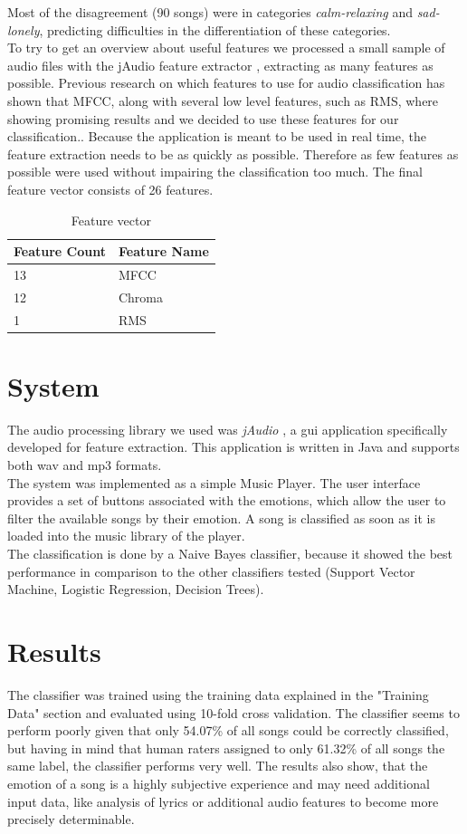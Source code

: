 \documentclass{sigchi-ext}
\begin{document}
Most of the disagreement (90 songs) were in categories \textit{calm-relaxing} and \textit{sad-lonely}, predicting difficulties in the differentiation of these categories.\\

To try to get an overview about useful features we processed a small sample of audio files with the jAudio feature extractor \cite{McEnnis2005}, extracting as many features as possible.
Previous research on which features to use for audio classification has shown that MFCC, along with several low level features, such as RMS, where showing promising results and we decided to use these features for our classification.\cite{Mckinney2003, Mandel2005, Tzanetakis2001}.  Because the application is meant to be used in real time, the feature extraction needs to be as quickly as possible. Therefore as few features as possible were used without impairing the classification too much. The final feature vector consists of 26 features.

\begin{table}
  \centering
  \begin{tabular}{@{}ll@{}}
    Feature Count & Feature Name \\ \midrule
    13 & MFCC \\
    12 & Chroma \\
    1  & RMS
  \end{tabular}
  \caption{Feature vector}
  \label{feature-vector}
\end{table}

\section{System}
The audio processing library we used was \textit{jAudio} \cite{McEnnis2005}, a gui application specifically developed for feature extraction. This application is written in Java and supports both wav and mp3 formats.\\
The system was implemented as a simple Music Player. The user interface provides a set of buttons associated with the emotions, which allow the user to filter the available songs by their emotion. A song is classified as soon as it is loaded into the music library of the player.\\
The classification is done by a Naive Bayes classifier, because it showed the best performance in comparison to the other classifiers tested (Support Vector Machine, Logistic Regression, Decision Trees).

\section{Results}
The classifier was trained using the training data explained in the "Training Data" section and evaluated using 10-fold cross validation. The classifier seems to perform poorly given that only 54.07\% of all songs could be correctly classified, but having in mind that human raters assigned to only 61.32\% of all songs the same label, the classifier performs very well. The results also show, that the emotion of a song is a highly subjective experience and may need additional input data, like analysis of lyrics or additional audio features to become more precisely determinable.
\end{document}
